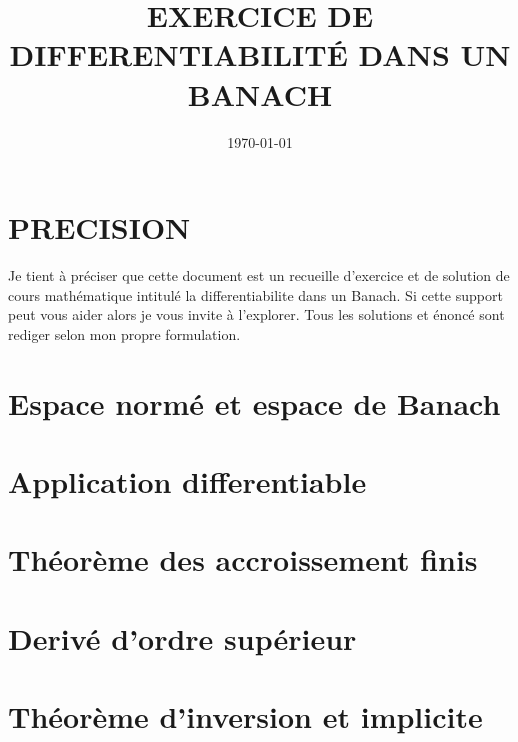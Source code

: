 \documentclass[12pt, a4paper, french]{article}
\title{EXERCICE DE DIFFERENTIABILITÉ DANS UN BANACH}
\date{\today}
\author{}
\theoremstyle{break}
\begin{document}
\section*{PRECISION}
Je tient à préciser que cette document est un recueille d'exercice et de solution de cours mathématique intitulé la differentiabilite dans un Banach. Si cette support peut vous aider alors je vous invite à l'explorer. Tous les solutions et énoncé sont rediger selon mon propre formulation.

\section{Espace normé et espace de Banach}


\section{Application differentiable}


\section{Théorème des accroissement finis}


\section{Derivé d'ordre supérieur}


\section{Théorème d'inversion et implicite}
\end{document}
